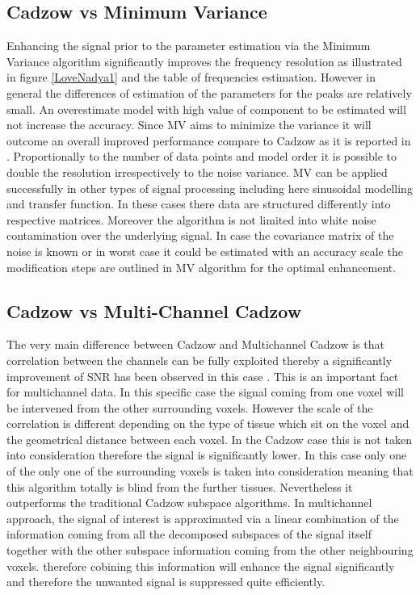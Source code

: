    
   



\newpage
\subsection{Cadzow vs Minimum Variance}

Enhancing the signal prior to the parameter estimation via the Minimum Variance algorithm significantly improves the frequency resolution as illustrated in figure \ref{LoveNadya1} and the table of frequencies estimation. However in general the differences of estimation of the parameters for the peaks are relatively small. An overestimate model with high value of component to be estimated will not increase the accuracy\cite{11}. Since MV aims to minimize the variance it will outcome an overall improved performance compare to Cadzow as it is reported in \cite{11}. Proportionally to the number of data points and model order it is possible to double the resolution irrespectively to the noise variance. MV can be applied successfully in other types of signal processing including here sinusoidal modelling and transfer function. In these cases there data are structured differently into respective matrices. Moreover the algorithm is not limited into white noise contamination over the underlying signal. In case the covariance matrix of the noise is known or in worst case it could be estimated with an accuracy scale the modification steps are outlined in MV algorithm for the optimal enhancement.  

\subsection{Cadzow vs Multi-Channel Cadzow}

The very main difference between Cadzow and Multichannel Cadzow is that correlation between the channels can be fully exploited thereby a significantly improvement of SNR has been observed in this case \cite{12}. This is an important fact for multichannel data. In this specific case the signal coming from one voxel will be intervened from the other surrounding voxels. However the scale of the correlation is different depending on the type of tissue which sit on the voxel and the geometrical distance between each voxel. In the Cadzow case this is not taken into consideration therefore the signal is significantly lower.  In this case only one of the only one of the surrounding voxels is taken into consideration meaning that this algorithm totally is blind from the further tissues. Nevertheless it outperforms the traditional Cadzow subspace algorithms. In multichannel approach, the signal of interest is approximated via a linear combination of the information coming from all the decomposed subspaces of the signal itself together with the other subspace information coming from the other neighbouring voxels. therefore cobining this information will enhance the signal significantly and therefore the unwanted signal is suppressed quite efficiently. 


